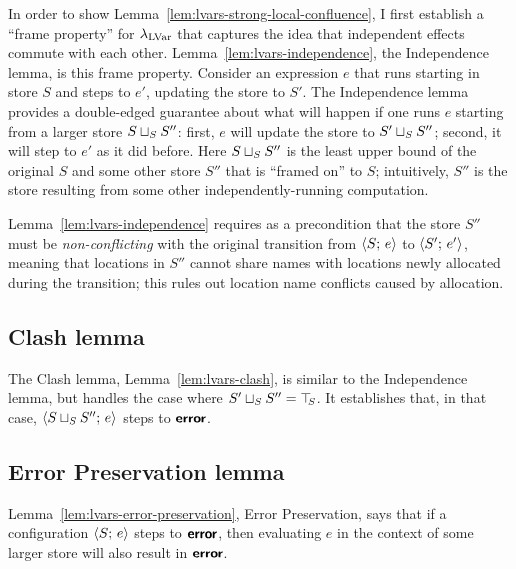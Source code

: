 In order to show
Lemma~\ref{lem:lvars-strong-local-confluence}, I first
establish a ``frame property'' for $\lambda_{\textrm{LVar}}$ that captures the
idea that independent effects commute with each other.
Lemma~\ref{lem:lvars-independence}, the Independence lemma, is this
frame property.  Consider an expression $e$ that runs starting in
store $S$ and steps to $e'$, updating the store to $S'$.  The
Independence lemma provides a double-edged guarantee about what will
happen if one runs $e$ starting from a larger store
$S \sqcup_{S} S''$: first, $e$ will update the store to
$S' \sqcup_{S} S''$; second, it will step to $e'$ as it did before.
Here $S \sqcup_{S} S''$ is the least upper bound of the original $S$
and some other store $S''$ that is ``framed on'' to $S$; intuitively,
$S''$ is the store resulting from some other independently-running
computation.

Lemma~\ref{lem:lvars-independence} requires as a precondition that the
store $S''$ must be \emph{non-conflicting} with the original
transition from $\langle S;\, e \rangle$ to $\langle S';\, e' \rangle$, meaning that
locations in $S''$ cannot share names with locations newly allocated
during the transition; this rules out location name conflicts caused
by allocation.

\LVarsDefNonConflicting

\LVarsLemIndependence


\subsection{Clash lemma}

The Clash lemma, Lemma~\ref{lem:lvars-clash}, is similar to the
Independence lemma, but handles the case where $S' \sqcup_{S} S'' =
\top\hspace{-0.85mm}_{S}$.  It establishes that, in that case,
$\langle S \sqcup_{S} S'';\, e \rangle$ steps to $\textbf{\textsf{error}}$.


\LVarsLemClash


\subsection{Error Preservation lemma}

Lemma~\ref{lem:lvars-error-preservation}, Error Preservation, says
that if a configuration $\langle S;\, e \rangle$ steps to $\textbf{\textsf{error}}$, then
evaluating $e$ in the context of some larger store will also result in
$\textbf{\textsf{error}}$.

